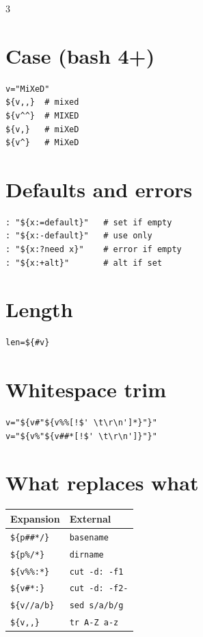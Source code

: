 \documentclass[10pt]{article}
\begin{document}
\begin{multicols}{3}
\section*{Case (bash 4+)}
\begin{lstlisting}
v="MiXeD"
${v,,}  # mixed
${v^^}  # MIXED
${v,}   # miXeD
${v^}   # MiXeD
\end{lstlisting}

\section*{Defaults and errors}
\begin{lstlisting}
: "${x:=default}"   # set if empty
: "${x:-default}"   # use only
: "${x:?need x}"    # error if empty
: "${x:+alt}"       # alt if set
\end{lstlisting}

\section*{Length}
\begin{lstlisting}
len=${#v}
\end{lstlisting}

\section*{Whitespace trim}
\begin{lstlisting}
v="${v#"${v%%[!$' \t\r\n']*}"}"
v="${v%"${v##*[!$' \t\r\n']}"}"
\end{lstlisting}

\section*{What replaces what}
\begin{tabular}{@{}p{}p{}@{}}
\toprule
Expansion & External \\
\midrule
\texttt{\$\{p\#\#*/\}}  & \texttt{basename} \\
\texttt{\$\{p\%/*\}}    & \texttt{dirname} \\
\texttt{\$\{v\%\%:*\}}  & \texttt{cut -d: -f1} \\
\texttt{\$\{v\#*:\}}    & \texttt{cut -d: -f2-} \\
\texttt{\$\{v//a/b\}}   & \texttt{sed s/a/b/g} \\
\texttt{\$\{v,,\}}      & \texttt{tr A-Z a-z} \\
\bottomrule
\end{tabular}

\end{multicols}
\end{document}
